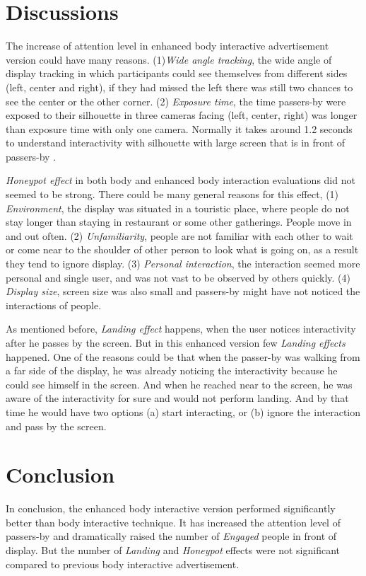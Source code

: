 \section{Discussions}
The increase of attention level in enhanced body interactive advertisement version could have many reasons. (1)\emph{Wide angle tracking}, the wide angle of display tracking in which participants could see themselves from different sides (left, center and right), if they had missed the left there was still two chances to see the center or the other corner. (2) \emph{Exposure time}, the time passers-by were exposed to their silhouette in three cameras facing (left, center, right) was longer than exposure time with only one camera. Normally it takes around 1.2 seconds to understand interactivity with silhouette with large screen that is in front of passers-by \cite{ LookingGlass}.

\emph{Honeypot effect} in both body and enhanced body interaction evaluations did not seemed to be strong. There could be many general reasons for this effect, (1) \emph{Environment}, the display was situated in a touristic place, where people do not stay longer than staying in restaurant or some other gatherings. People move in and out often. (2) \emph{Unfamiliarity}, people are not familiar with each other to wait or come near to the shoulder of other person to look what is going on, as a result they tend to ignore display. (3) \emph{Personal interaction}, the interaction seemed more personal and single user,  and was not vast to be observed by others quickly. (4) \emph{Display size}, screen size was also small and passers-by might have not noticed the interactions of people.

As mentioned before, \emph{Landing effect} happens, when the user notices interactivity after he passes by the screen. But in this enhanced version few \emph{Landing effects} happened. One of the reasons could be that when the passer-by was walking from a far side of the display, he was already noticing the interactivity because he could see himself in the screen. And when he reached near to the screen, he was aware of the interactivity for sure and would not perform landing. And by that time he would have two options (a) start interacting, or (b) ignore the interaction and pass by the screen.


\section{Conclusion}
In conclusion, the enhanced body interactive version performed significantly better than body interactive technique. It has increased the attention level of passers-by and dramatically raised the number of \emph{Engaged} people in front of display. But the number of \emph{Landing} and \emph{Honeypot} effects were not significant compared to previous body interactive advertisement.

